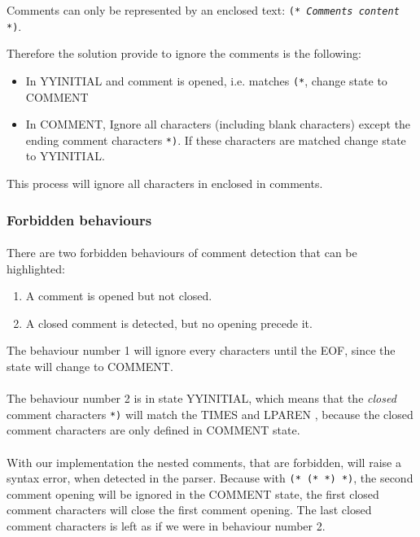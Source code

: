 \documentclass[letterpaper]{article}
\begin{document}
Comments can only be represented by an enclosed text:
 \texttt{(* \textit{Comments content} *)}.

Therefore the solution provide to ignore the comments is the following:
\begin{itemize}

\item In YYINITIAL and comment is opened, i.e. matches \texttt{(*},
change state to COMMENT

\item In COMMENT, Ignore all characters
(including blank characters) except the ending comment
characters \texttt{*)}.
If these characters are matched change state to YYINITIAL.

\end{itemize}

This process will ignore all characters in enclosed in comments.

\subsubsection{Forbidden behaviours}
\label{comment_forbidden}
\paragraph{}
There are two forbidden behaviours of comment detection that can be highlighted:

\begin{enumerate}
    \item A comment is opened but not closed.
    \item A closed comment is detected, but no opening precede it.
\end{enumerate}

The behaviour number 1 will ignore every characters until the EOF, since
the state will change to COMMENT.
\paragraph{}

The behaviour number 2 is in state YYINITIAL,
which means that the \textit{closed}
comment characters \texttt{*)} will match
the TIMES and LPAREN ,
because the closed comment characters are only defined in COMMENT state.
\paragraph{}

With our implementation the nested comments, that are forbidden, will
raise a syntax error, when detected in the parser. Because with
\texttt{(* (* *) *)}, the second comment opening will be ignored in the
COMMENT state, the first closed comment characters will close the first comment
opening. The last closed comment characters is left as if we were in
behaviour number 2.
\end{document}
